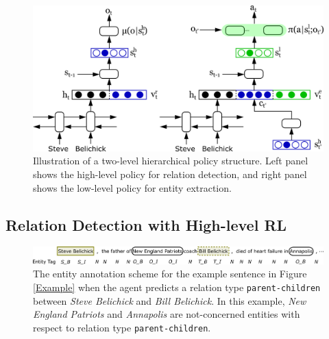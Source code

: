 \documentclass[letterpaper]{article} %
\theoremstyle{definition}
\begin{document}

\begin{figure}[!hptb]
    \centering
    \includegraphics[width=\linewidth]{high-low.png}
    \caption{Illustration of a two-level hierarchical policy structure. Left panel shows the high-level policy for relation detection, and right panel shows the low-level policy for entity extraction.}
    \label{policy}
\end{figure}

\subsection{Relation Detection with High-level RL}

\begin{figure}[!tpb]
    \centering
    \includegraphics[width=\linewidth]{annotation.png}
    \caption{The entity annotation scheme for the example sentence in Figure \ref{Example} when the agent predicts a relation type \texttt{parent-children} between \textit{Steve Belichick} and \textit{Bill Belichick}. In this example, \textit{New England Patriots} and \textit{Annapolis} are not-concerned entities with respect to relation type \texttt{parent-children}.
    }
    \label{tag}
\end{figure}
\end{document}
